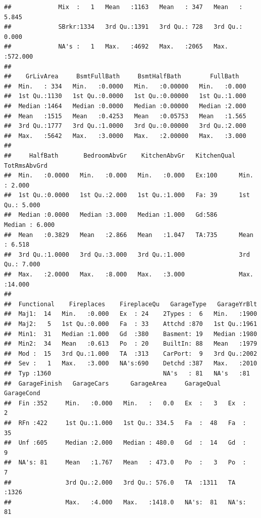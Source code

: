 \documentclass[
]{article}
\begin{document}
\begin{verbatim}
##             Mix  :   1   Mean   :1163   Mean   : 347   Mean   :  5.845  
##             SBrkr:1334   3rd Qu.:1391   3rd Qu.: 728   3rd Qu.:  0.000  
##             NA's :   1   Max.   :4692   Max.   :2065   Max.   :572.000  
##                                                                         
##    GrLivArea     BsmtFullBath     BsmtHalfBath        FullBath    
##  Min.   : 334   Min.   :0.0000   Min.   :0.00000   Min.   :0.000  
##  1st Qu.:1130   1st Qu.:0.0000   1st Qu.:0.00000   1st Qu.:1.000  
##  Median :1464   Median :0.0000   Median :0.00000   Median :2.000  
##  Mean   :1515   Mean   :0.4253   Mean   :0.05753   Mean   :1.565  
##  3rd Qu.:1777   3rd Qu.:1.0000   3rd Qu.:0.00000   3rd Qu.:2.000  
##  Max.   :5642   Max.   :3.0000   Max.   :2.00000   Max.   :3.000  
##                                                                   
##     HalfBath       BedroomAbvGr    KitchenAbvGr   KitchenQual  TotRmsAbvGrd   
##  Min.   :0.0000   Min.   :0.000   Min.   :0.000   Ex:100      Min.   : 2.000  
##  1st Qu.:0.0000   1st Qu.:2.000   1st Qu.:1.000   Fa: 39      1st Qu.: 5.000  
##  Median :0.0000   Median :3.000   Median :1.000   Gd:586      Median : 6.000  
##  Mean   :0.3829   Mean   :2.866   Mean   :1.047   TA:735      Mean   : 6.518  
##  3rd Qu.:1.0000   3rd Qu.:3.000   3rd Qu.:1.000               3rd Qu.: 7.000  
##  Max.   :2.0000   Max.   :8.000   Max.   :3.000               Max.   :14.000  
##                                                                               
##  Functional    Fireplaces    FireplaceQu   GarageType   GarageYrBlt  
##  Maj1:  14   Min.   :0.000   Ex  : 24    2Types :  6   Min.   :1900  
##  Maj2:   5   1st Qu.:0.000   Fa  : 33    Attchd :870   1st Qu.:1961  
##  Min1:  31   Median :1.000   Gd  :380    Basment: 19   Median :1980  
##  Min2:  34   Mean   :0.613   Po  : 20    BuiltIn: 88   Mean   :1979  
##  Mod :  15   3rd Qu.:1.000   TA  :313    CarPort:  9   3rd Qu.:2002  
##  Sev :   1   Max.   :3.000   NA's:690    Detchd :387   Max.   :2010  
##  Typ :1360                               NA's   : 81   NA's   :81    
##  GarageFinish   GarageCars      GarageArea     GarageQual  GarageCond 
##  Fin :352     Min.   :0.000   Min.   :   0.0   Ex  :   3   Ex  :   2  
##  RFn :422     1st Qu.:1.000   1st Qu.: 334.5   Fa  :  48   Fa  :  35  
##  Unf :605     Median :2.000   Median : 480.0   Gd  :  14   Gd  :   9  
##  NA's: 81     Mean   :1.767   Mean   : 473.0   Po  :   3   Po  :   7  
##               3rd Qu.:2.000   3rd Qu.: 576.0   TA  :1311   TA  :1326  
##               Max.   :4.000   Max.   :1418.0   NA's:  81   NA's:  81  

\end{verbatim}
\end{document}
